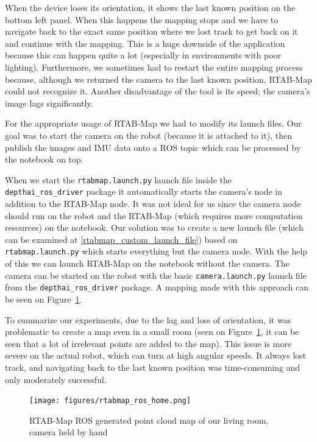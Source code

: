 When the device loses its orientation, it shows the last known position on the bottom left panel. When this happens the mapping stops and we have to navigate back to the exact same position where we lost track to get back on it and continue with the mapping. This is a huge downside of the application because this can happen quite a lot (especially in environments with poor lighting). Furthermore, we sometimes had to restart the entire mapping process because, although we returned the camera to the last known position, RTAB-Map could not recognize it. Another disadvantage of the tool is its speed; the camera's image lags significantly.

For the appropriate usage of RTAB-Map we had to modify its launch files. Our goal was to start the camera on the robot (because it is attached to it), then publish the images and IMU data onto a ROS topic which can be processed by the notebook on top.

When we start the \verb|rtabmap.launch.py| launch file inside the \verb|depthai_ros_driver| package it automatically starts the camera's node in addition to the RTAB-Map node. It was not ideal for us since the camera node should run on the robot and the RTAB-Map (which requires more computation resources) on the notebook. Our solution was to create a new launch file (which can be examined at \ref{rtabmap_custom_launch_file}) based on \verb|rtabmap.launch.py| which starts everything but the camera node. With the help of this we can launch RTAB-Map on the notebook without the camera. The camera can be started on the robot with the basic \verb|camera.launch.py| launch file from the \verb|depthai_ros_driver| package. A mapping made with this approach can be seen on Figure~\ref{fig:rtabmap_nokia}.

To summarize our experiments, due to the lag and loss of orientation, it was problematic to create a map even in a small room (seen on Figure~\ref{fig:rtabmap_nokia}, it can be seen that a lot of irrelevant points are added to the map). This issue is more severe on the actual robot, which can turn at high angular speeds. It always lost track, and navigating back to the last known position was time-consuming and only moderately successful.

\begin{figure}[H]
	\centering
	\texttt{[image: figures/rtabmap\_ros\_home.png]}
	\caption{RTAB-Map ROS generated point cloud map of our living room, camera held by hand}
	\label{fig:rtabmap_nokia}
\end{figure}


